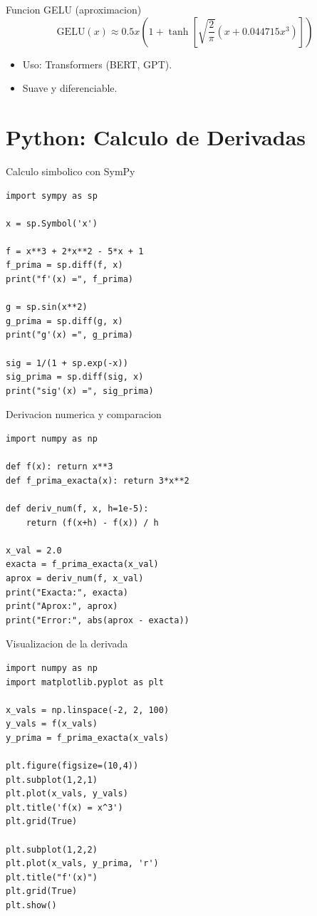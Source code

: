 \documentclass[aspectratio=169, 10pt, xcolor=table]{beamer}
\begin{document}
\begin{frame}{Funcion GELU (aproximacion)}
    \[
    \text{GELU}(x) \approx 0.5x\left(1 + \tanh\left[\sqrt{\frac{2}{\pi}}(x+0.044715x^3)\right]\right)
    \]
    \begin{itemize}
        \item Uso: Transformers (BERT, GPT).
        \item Suave y diferenciable.
    \end{itemize}
\end{frame}

\section{Python: Calculo de Derivadas}

\begin{frame}[fragile]{Calculo simbolico con SymPy}
    \begin{lstlisting}
import sympy as sp

x = sp.Symbol('x')

f = x**3 + 2*x**2 - 5*x + 1
f_prima = sp.diff(f, x)
print("f'(x) =", f_prima)

g = sp.sin(x**2)
g_prima = sp.diff(g, x)
print("g'(x) =", g_prima)

sig = 1/(1 + sp.exp(-x))
sig_prima = sp.diff(sig, x)
print("sig'(x) =", sig_prima)
    \end{lstlisting}
\end{frame}

\begin{frame}[fragile]{Derivacion numerica y comparacion}
    \begin{lstlisting}
import numpy as np

def f(x): return x**3
def f_prima_exacta(x): return 3*x**2

def deriv_num(f, x, h=1e-5):
    return (f(x+h) - f(x)) / h

x_val = 2.0
exacta = f_prima_exacta(x_val)
aprox = deriv_num(f, x_val)
print("Exacta:", exacta)
print("Aprox:", aprox)
print("Error:", abs(aprox - exacta))
    \end{lstlisting}
\end{frame}

\begin{frame}[fragile]{Visualizacion de la derivada}
    \begin{lstlisting}
import numpy as np
import matplotlib.pyplot as plt

x_vals = np.linspace(-2, 2, 100)
y_vals = f(x_vals)
y_prima = f_prima_exacta(x_vals)

plt.figure(figsize=(10,4))
plt.subplot(1,2,1)
plt.plot(x_vals, y_vals)
plt.title('f(x) = x^3')
plt.grid(True)

plt.subplot(1,2,2)
plt.plot(x_vals, y_prima, 'r')
plt.title("f'(x)")
plt.grid(True)
plt.show()
    \end{lstlisting}
\end{frame}
\end{document}
